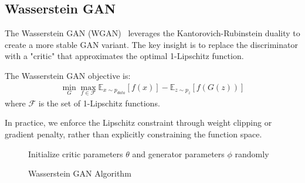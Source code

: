 \subsection{Wasserstein GAN}

The Wasserstein GAN (WGAN)~\cite{ref:arjovsky-2017} leverages the Kantorovich-Rubinstein duality to create a more stable GAN variant. The key insight is to replace the discriminator with a "critic" that approximates the optimal 1-Lipschitz function.

\begin{definition}
  The \textnormal{\sffamily Wasserstein GAN objective} is:
  \begin{align}
    \min_G \max_{f \in \mathcal{F}} \mathbb{E}_{x \sim p_{data}}[f(x)] - \mathbb{E}_{z \sim p_z}[f(G(z))]
  \end{align}
  where $\mathcal{F}$ is the set of 1-Lipschitz functions.
\end{definition}

In practice, we enforce the Lipschitz constraint through weight clipping or gradient penalty, rather than explicitly constraining the function space.

\begin{figure}[H]
  \centering
  \begin{minipage}{0.9\linewidth}
    \begin{algorithm}[H]
      \SetAlgoLined
      Initialize critic parameters $\theta$ and generator parameters $\phi$ randomly\;
      \caption{Wasserstein GAN Algorithm}
      \label{algo:wgan}
    \end{algorithm}
  \end{minipage}
\end{figure}

